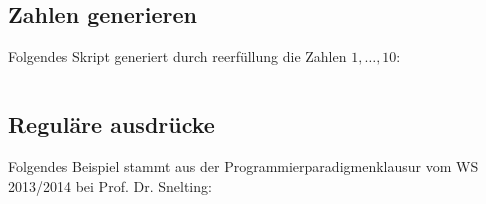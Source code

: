 



\subsection{Zahlen generieren}
Folgendes Skript generiert durch reerfüllung die Zahlen $1, \dots, 10$:

\inputminted[numbersep=5pt, tabsize=4]{prolog}{scripts/prolog/zahlen-bis-10.pl}

\subsection{Reguläre ausdrücke}
Folgendes Beispiel stammt aus der Programmierparadigmenklausur vom WS 2013/2014
bei Prof. Dr. Snelting:

